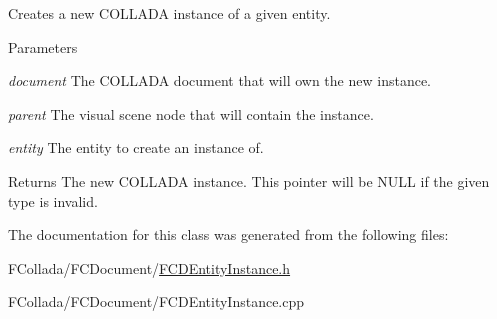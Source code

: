 \label{classFCDEntityInstanceFactory_af3cad5e62eb5b634ec9bfeb096ca06e3}
Creates a new COLLADA instance of a given entity. 
\begin{DoxyParams}{Parameters}
\item[{\em document}]The COLLADA document that will own the new instance. \item[{\em parent}]The visual scene node that will contain the instance. \item[{\em entity}]The entity to create an instance of. \end{DoxyParams}
\begin{DoxyReturn}{Returns}
The new COLLADA instance. This pointer will be NULL if the given type is invalid. 
\end{DoxyReturn}


The documentation for this class was generated from the following files:\begin{DoxyCompactItemize}
\item 
FCollada/FCDocument/\hyperlink{FCDEntityInstance_8h}{FCDEntityInstance.h}\item 
FCollada/FCDocument/FCDEntityInstance.cpp\end{DoxyCompactItemize}
